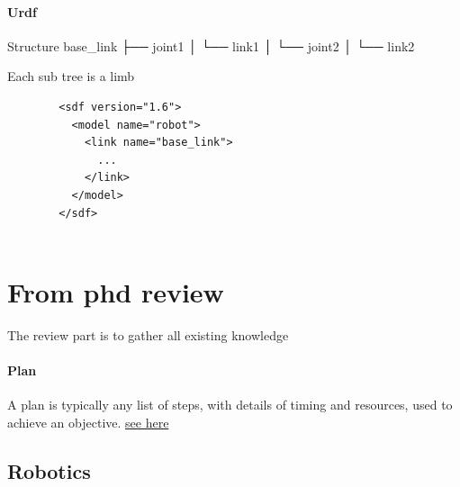 \documentclass{book}
\newcommand{\seehere}[1]{\href{#1}{see here}}
\providecommand{\seehere}[1]{\href{#1}{see here}}
\begin{document}
\subsubsection{Urdf}


Structure
    base\_link
         ├── joint1
         │    └── link1
         │         └── joint2
         │              └── link2
    
    Each sub tree is a limb




    \begin{verbatim}
        <sdf version="1.6">
          <model name="robot">
            <link name="base_link">
              ...
            </link>
          </model>
        </sdf>
        
    \end{verbatim}

\chapter{From phd review}






The review part is to gather all existing knowledge




















\subsubsection{Plan}


A plan is typically any list of steps, with details of timing and resources, used to achieve an objective. \seehere{https://en.wikipedia.org/wiki/Plan}

\section{Robotics}
\end{document}
